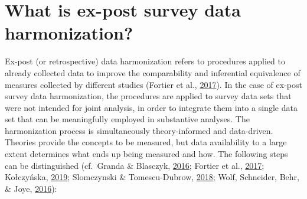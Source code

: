 \documentclass[12pt,]{article}
\begin{document}
\hypertarget{what-is-ex-post-survey-data-harmonization}{%
\section{What is ex-post survey data harmonization?}\label{what-is-ex-post-survey-data-harmonization}}

Ex-post (or retrospective) data harmonization refers to procedures applied to already collected data to improve the comparability and inferential equivalence of measures collected by different studies (Fortier et al., \protect\hyperlink{ref-Fortier2017a}{2017}). In the case of ex-post survey data harmonization, the procedures are applied to survey data sets that were not intended for joint analysis, in order to integrate them into a single data set that can be meaningfully employed in substantive analyses. The harmonization process is simultaneously theory-informed and data-driven. Theories provide the concepts to be measured, but data availability to a large extent determines what ends up being measured and how. The following steps can be distinguished (cf.~Granda \& Blasczyk, \protect\hyperlink{ref-Granda2016}{2016}; Fortier et al., \protect\hyperlink{ref-Fortier2017a}{2017}; Kołczyńska, \protect\hyperlink{ref-Kolczynska2019}{2019}; Slomczynski \& Tomescu-Dubrow, \protect\hyperlink{ref-Slomczynski2018}{2018}; Wolf, Schneider, Behr, \& Joye, \protect\hyperlink{ref-Wolf2016}{2016}):
\end{document}
